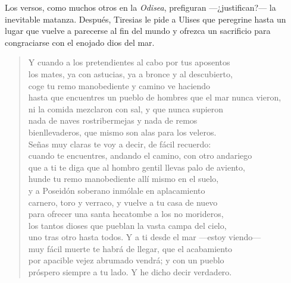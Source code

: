 \documentclass[11pt,a4paper]{article}
\begin{document}
Los versos, como muchos otros en la \emph{Odisea}, prefiguran ---¿justifican?--- la inevitable matanza. Después, Tiresias le pide a Ulises que peregrine hasta un lugar que vuelve a parecerse al fin del mundo y ofrezca un sacrificio para congraciarse con el enojado dios del mar.

\begin{verse}
Y cuando a los pretendientes al cabo por tus aposentos\\
los mates, ya con astucias, ya a bronce y al descubierto,\\
coge tu remo manobediente y camino ve haciendo\\
hasta que encuentres un pueblo de hombres que el mar nunca vieron,\\
ni la comida mezclaron con sal, y que nunca supieron\\
nada de naves rostribermejas y nada de remos\\
bienllevaderos, que mismo son alas para los veleros.\\
Señas muy claras te voy a decir, de fácil recuerdo:\\
cuando te encuentres, andando el camino, con otro andariego\\
que a ti te diga que al hombro gentil llevas palo de aviento,\\
hunde tu remo manobediente allí mismo en el suelo,\\
y a Poseidón soberano inmólale en aplacamiento\\
carnero, toro y verraco, y vuelve a tu casa de nuevo\\
para ofrecer una santa hecatombe a los no morideros,\\
los tantos dioses que pueblan la vasta campa del cielo,\\
uno tras otro hasta todos. Y a ti desde el mar ---estoy viendo---\\
muy fácil muerte te habrá de llegar, que el acabamiento\\
por apacible vejez abrumado vendrá; y con un pueblo\\
próspero siempre a tu lado. Y he dicho decir verdadero.
\end{verse}
\end{document}
